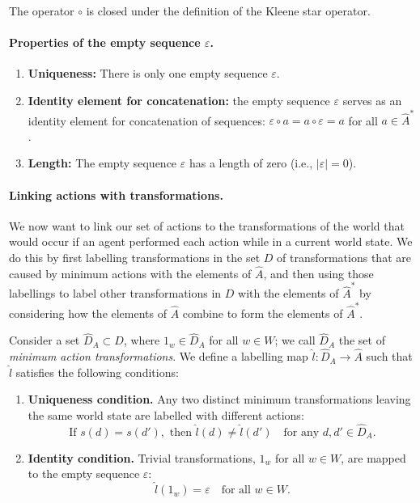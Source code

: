 The operator $\circ$ is closed under the definition of the Kleene star operator.

\paragraph{Properties of the empty sequence $\varepsilon$.}
\begin{enumerate}
	\item \textbf{Uniqueness:} There is only one empty sequence $\varepsilon$.
	\item \textbf{Identity element for concatenation:} the empty sequence $\varepsilon$ serves as an identity element for concatenation of sequences:
	      $\varepsilon \circ a = a \circ \varepsilon = a$ for all $a \in \hat{A}^{\ast}$.
	\item \textbf{Length:} The empty sequence $\varepsilon$ has a length of zero (i.e., $|\varepsilon| = 0$).
\end{enumerate}

\paragraph{Linking actions with transformations.}
We now want to link our set of actions to the transformations of the world that would occur if an agent performed each action while in a current world state.
We do this by first labelling transformations in the set $D$ of transformations that are caused by minimum actions with the elements of $\hat{A}$, and then using those labellings to label other transformations in $D$ with the elements of $\hat{A}^{\ast}$ by considering how the elements of $\hat{A}$ combine to form the elements of $\hat{A}^{\ast}$.

Consider a set $\hat{D}_{A} \subset D$, where $1_{w} \in \hat{D}_{A}$ for all $w \in W$; we call $\hat{D}_{A}$ the set of \textit{minimum action transformations}.
We define a labelling map $\hat{l}: \hat{D}_{A} \to \hat{A}$ such that $\hat{l}$ satisfies the following conditions:
\begin{enumerate}
	\item \textbf{Uniqueness condition.}
	      Any two distinct minimum transformations leaving the same world state are labelled with different actions:
	      \begin{equation}
		      \text{If } s(d) = s(d'), \text{ then } \hat{l}(d) \neq \hat{l}(d') \quad \text{for any } d, d' \in \hat{D}_{A}.
	      \end{equation}

	\item \textbf{Identity condition.}
	      Trivial transformations, $1_{w}$ for all $w \in W$, are mapped to the empty sequence $\varepsilon$:
	      \begin{equation}
		      \hat{l}(1_{w}) = \varepsilon \quad \text{for all } w \in W.
	      \end{equation}
\end{enumerate}

